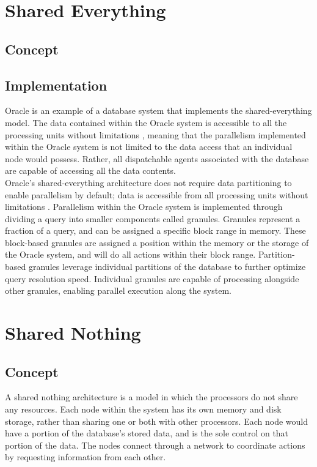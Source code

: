 \documentclass[onecolumn, draftclsnofoot,10pt, compsoc]{IEEEtran}
\begin{document}
	\newpage
	\tableofcontents
	\clearpage
	
	\section{Shared Everything}

    \subsection{Concept}

    \subsection{Implementation}
   \indent  Oracle is an example of a database system that implements the shared-everything model. The data contained within the Oracle system is accessible to all the processing units without limitations \cite{OraclePEwODF}, meaning that the parallelism implemented within the Oracle system is not limited to the data access that an individual node would possess. Rather, all dispatchable agents associated with the database are capable of accessing all the data contents. \\

\indent Oracle’s shared-everything architecture does not require data partitioning to enable parallelism by default; data is accessible from all processing units without limitations \cite{OraclePEwODF}. Parallelism within the Oracle system is implemented through dividing a query into smaller components called granules. Granules represent a fraction of a query, and can be assigned a specific block range in memory. These block-based granules are assigned a position within the memory or the storage of the Oracle system, and will do all actions within their block range. Partition-based granules leverage individual partitions of the database to further optimize query resolution speed. Individual granules are capable of processing alongside other granules, enabling parallel execution along the system. 


	\section{Shared Nothing}
	
    \subsection{Concept}
    \indent A shared nothing architecture is a model in which the processors do not share any resources. Each node within the system has its own memory and disk storage, rather than sharing one or both with other processors. Each node would have a portion of the database’s stored data, and is the sole control on that portion of the data. The nodes connect through a network to coordinate actions by requesting information from each other. \\
\end{document}
